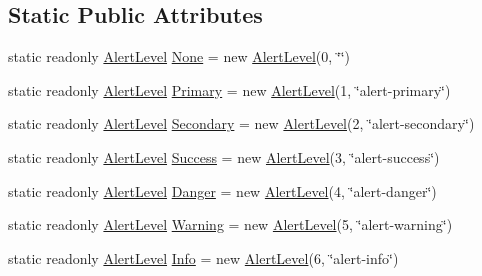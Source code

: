 \subsection*{Static Public Attributes}
\begin{DoxyCompactItemize}
\item 
static readonly \mbox{\hyperlink{classWebApplication_1_1Framework_1_1AlertLevel}{Alert\+Level}} \mbox{\hyperlink{classWebApplication_1_1Framework_1_1AlertLevel_ae3fedb6b350a354a160e3da9b32f3d2a}{None}} = new \mbox{\hyperlink{classWebApplication_1_1Framework_1_1AlertLevel}{Alert\+Level}}(0, \char`\"{}\char`\"{})
\item 
static readonly \mbox{\hyperlink{classWebApplication_1_1Framework_1_1AlertLevel}{Alert\+Level}} \mbox{\hyperlink{classWebApplication_1_1Framework_1_1AlertLevel_ae0dd7167ac790fd80e8e82f83b3055c2}{Primary}} = new \mbox{\hyperlink{classWebApplication_1_1Framework_1_1AlertLevel}{Alert\+Level}}(1, \char`\"{}alert-\/primary\char`\"{})
\item 
static readonly \mbox{\hyperlink{classWebApplication_1_1Framework_1_1AlertLevel}{Alert\+Level}} \mbox{\hyperlink{classWebApplication_1_1Framework_1_1AlertLevel_aba99c74682e483adb1b9509b49a66fd1}{Secondary}} = new \mbox{\hyperlink{classWebApplication_1_1Framework_1_1AlertLevel}{Alert\+Level}}(2, \char`\"{}alert-\/secondary\char`\"{})
\item 
static readonly \mbox{\hyperlink{classWebApplication_1_1Framework_1_1AlertLevel}{Alert\+Level}} \mbox{\hyperlink{classWebApplication_1_1Framework_1_1AlertLevel_a387cc8ca0f91197b2c293246e3a845f5}{Success}} = new \mbox{\hyperlink{classWebApplication_1_1Framework_1_1AlertLevel}{Alert\+Level}}(3, \char`\"{}alert-\/success\char`\"{})
\item 
static readonly \mbox{\hyperlink{classWebApplication_1_1Framework_1_1AlertLevel}{Alert\+Level}} \mbox{\hyperlink{classWebApplication_1_1Framework_1_1AlertLevel_af252369367ae2302d659ad14d3c08238}{Danger}} = new \mbox{\hyperlink{classWebApplication_1_1Framework_1_1AlertLevel}{Alert\+Level}}(4, \char`\"{}alert-\/danger\char`\"{})
\item 
static readonly \mbox{\hyperlink{classWebApplication_1_1Framework_1_1AlertLevel}{Alert\+Level}} \mbox{\hyperlink{classWebApplication_1_1Framework_1_1AlertLevel_a446058e14c2e46ed2ed3232cb6c6b155}{Warning}} = new \mbox{\hyperlink{classWebApplication_1_1Framework_1_1AlertLevel}{Alert\+Level}}(5, \char`\"{}alert-\/warning\char`\"{})
\item 
static readonly \mbox{\hyperlink{classWebApplication_1_1Framework_1_1AlertLevel}{Alert\+Level}} \mbox{\hyperlink{classWebApplication_1_1Framework_1_1AlertLevel_aaa4d6eaa26c145f7e337fe5c14914810}{Info}} = new \mbox{\hyperlink{classWebApplication_1_1Framework_1_1AlertLevel}{Alert\+Level}}(6, \char`\"{}alert-\/info\char`\"{})

\end{DoxyCompactItemize}
